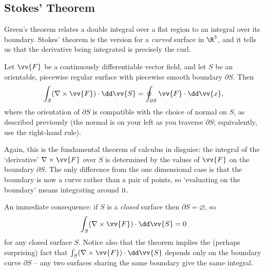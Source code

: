 \subsection{Stokes' Theorem}

Green's theorem relates a double integral over a flat region to an integral over its boundary. Stokes' theorem is the version for a \emph{curved} surface in $\R^3$, and it tells us that the derivative being integrated is precisely the curl.

\begin{theorem}
	Let $\vv{F}$ be a continuously differentiable vector field, and let $S$ be an orientable, piecewise regular surface with piecewise smooth boundary $\partial S$. Then
	$$
	\int_S (\nabla \times \vv{F}) \cdot \dd \vv{S} = \oint_{\partial S} \vv{F} \cdot \dd \vv{x},
	$$
	where the orientation of $\partial S$ is compatible with the choice of normal on $S$, as described previously (the normal is on your left as you traverse $\partial S$; equivalently, use the right-hand rule).
\end{theorem}

Again, this is the fundamental theorem of calculus in disguise: the integral of the `derivative' $\nabla \times \vv{F}$ over $S$ is determined by the values of $\vv{F}$ on the boundary $\partial S$. The only difference from the one dimensional case is that the boundary is now a curve rather than a pair of points, so `evaluating on the boundary' means integrating around it.

An immediate consequence: if $S$ is a \emph{closed} surface then $\partial S = \varnothing$, so
$$
\int_S (\nabla \times \vv{F}) \cdot \dd \vv{S} = 0
$$
for any closed surface $S$. Notice also that the theorem implies the (perhaps surprising) fact that $\int_S (\nabla \times \vv{F}) \cdot \dd \vv{S}$ depends only on the boundary curve $\partial S$ -- any two surfaces sharing the same boundary give the same integral.

